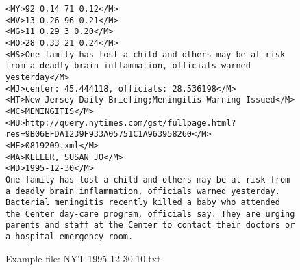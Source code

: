 \begin{figure}
\footnotesize
\begin{lstlisting}[breaklines]
<MY>92 0.14 71 0.12</M>
<MV>13 0.26 96 0.21</M>
<MG>11 0.29 3 0.20</M>
<MO>28 0.33 21 0.24</M>
<MS>One family has lost a child and others may be at risk from a deadly brain inflammation, officials warned yesterday</M>
<MJ>center: 45.444118, officials: 28.536198</M>
<MT>New Jersey Daily Briefing;Meningitis Warning Issued</M>
<MC>MENINGITIS</M>
<MU>http://query.nytimes.com/gst/fullpage.html?res=9B06EFDA1239F933A05751C1A963958260</M>
<MF>0819209.xml</M>
<MA>KELLER, SUSAN JO</M>
<MD>1995-12-30</M>
One family has lost a child and others may be at risk from a deadly brain inflammation, officials warned yesterday. Bacterial meningitis recently killed a baby who attended the Center day-care program, officials say. They are urging parents and staff at the Center to contact their doctors or a hospital emergency room.
\end{lstlisting}
\caption{Example file: NYT-1995-12-30-10.txt}
\label{fig:exfile}
\end{figure}

% 
% 
% 
		
%